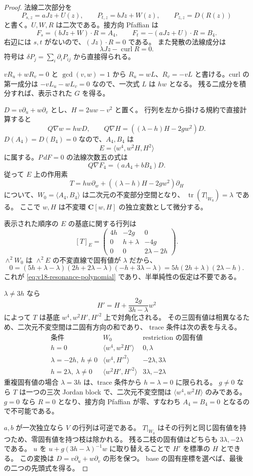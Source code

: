 \documentclass[11pt,a4paper]{ltjsarticle}
\theoremstyle{remark}\newtheorem{remark}[theorem]{注意}
\begin{document}
\begin{proof}
法線二次部分を
\[
 P_{s,z}=aJz+U(z),\qquad P_{t,z}=bJz+W(z),\qquad P_{z,z}=D(R(z))
\]
と書く。$U,W,R$ は二次である。接方向 Pfaffian は
\[
 F_s=(bJz+W)\cdot R=A_4,
 \qquad F_t=-(aJz+U)\cdot R=B_4.
\]
右辺には $s,t$ がないので、$(Jz)\cdot R=0$ である。
また発散の法線成分は
\[
       \lambda Jz-\operatorname{curl}R=0.
\]
符号は $\delta P_j=\sum_i\partial_iP_{ij}$ から直接得られる。

$vR_u+wR_v=0$ と $\gcd(v,w)=1$ から
$R_u=wL$、$R_v=-vL$ と書ける。curl の第一成分は
$-vL_u-wL_v=0$ なので、一次式 $L$ は $hw$ となる。
残る二成分を積分すれば、表示された $G$ を得る。

$D=v\partial_u+w\partial_v$ とし、$H=2uw-v^2$ と置く。
行列を左から掛ける規約で直接計算すると
\[
 Q\nabla w=h wD,
 \qquad Q\nabla H=((\lambda-h)H-2g w^2)D.
\]
$D(A_4)=D(B_4)=0$ なので、$A_4,B_4$ は
\[
 E=\langle w^4,w^2H,H^2\rangle
\]
に属する。$P\,dF=0$ の法線次数五の式は
\[
             Q\nabla F_4=(aA_4+bB_4)D.
\]
従って $E$ 上の作用素
\[
 T=h w\partial_w+((\lambda-h)H-2g w^2)\partial_H
\]
について、$W_0=\langle A_4,B_4\rangle$ は二次元の不変部分空間となり、
$\operatorname{tr}(T|_{W_0})=\lambda$ である。
ここで $w,H$ は不変環 $\mathbf C[w,H]$ の独立変数として微分する。

表示された順序の $E$ の基底に関する行列は
\[
 [T]_E=\begin{pmatrix}
 4h&-2g&0\\0&h+\lambda&-4g\\0&0&2\lambda-2h
 \end{pmatrix}.
\]
$\wedge^2W_0$ は $\wedge^2E$ の不変直線で固有値が $\lambda$ だから、
\[
 0=(5h+\lambda-\lambda)(2h+2\lambda-\lambda)
       (-h+3\lambda-\lambda)
   =5h(2h+\lambda)(2\lambda-h).
\]
これが \eqref{eq:v18-resonance-polynomial} であり、半単純性の仮定は不要である。

$\lambda\ne3h$ なら
\[
 H'=H+\frac{2g}{3h-\lambda}w^2
\]
によって $T$ は基底 $w^4,w^2H',H'^2$ 上で対角化される。
その三固有値は相異なるため、二次元不変空間は二固有方向の和であり、
trace 条件は次の表を与える。
\[
\begin{array}{c|c|c}
\text{条件}&W_0&\text{restriction の固有値}\\\hline
h=0&\langle w^4,w^2H'\rangle&0,\lambda\\
\lambda=-2h,\ h\ne0&\langle w^4,H'^2\rangle&-2\lambda,3\lambda\\
h=2\lambda,\ \lambda\ne0&\langle w^2H',H'^2\rangle&3\lambda,-2\lambda
\end{array}
\]
重複固有値の場合 $\lambda=3h$ は、trace 条件から $h=\lambda=0$ に限られる。
$g\ne0$ なら $T$ は一つの三次 Jordan block で、二次元不変空間は
$\langle w^4,w^2H\rangle$ のみである。
$g=0$ なら $R=0$ となり、接方向 Pfaffian が零、すなわち
$A_4=B_4=0$ となるので不可能である。

$a,b$ が一次独立なら $V$ の行列は可逆である。
$T|_{W_0}$ はその行列と同じ固有値を持つため、零固有値を持つ枝は除かれる。
残る二枝の固有値はどちらも $3\lambda,-2\lambda$ である。
$u$ を $u+g(3h-\lambda)^{-1}w$ に取り替えることで $H'$ を標準の $H$ とできる。
この変換は $D=v\partial_u+w\partial_v$ の形を保つ。
base の固有座標を選べば、最後の二つの先頭式を得る。
\end{proof}
\end{document}
